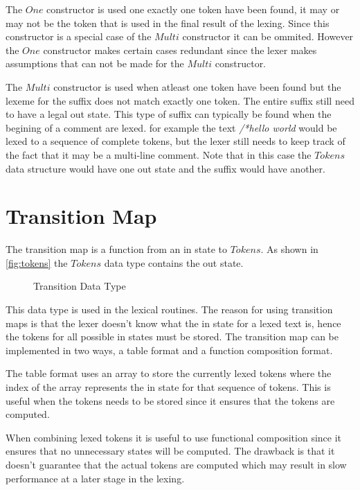 The $One$ constructor is used one exactly one token have been found, it may or
may not be the token that is used in the final result of the lexing. Since this
constructor is a special case of the $Multi$ constructor it can be ommited.
However the $One$ constructor makes certain cases redundant since the lexer
makes assumptions that can not be made for the $Multi$ constructor.

The $Multi$ constructor is used when atleast one token have been found but the
lexeme for the suffix does not match exactly one token. The entire suffix still
need to have a legal out state. This type of suffix can typically be found when
the begining of a comment are lexed. for example the text
\emph{/*hello world} would be lexed to a sequence of complete tokens, but the
lexer still needs to keep track of the fact that it may be a multi-line
comment. Note that in this case the $Tokens$ data structure would have one out
state and the suffix would have another.

\section{Transition Map}
The transition map is a function from an in state to $Tokens$. As shown in
\cref{fig:tokens} the $Tokens$ data type contains the out state.

\begin{figure}[h!]
  
  \caption{Transition Data Type \label{fig:transition}}
\end{figure}

This data type is used in the lexical routines. The reason for using transition
maps is that the lexer doesn't know what the in state for a lexed text is, hence
the tokens for all possible in states must be stored. The transition map can be
implemented in two ways, a table format and a function composition format.

The table format uses an array to store the currently lexed tokens where the
index of the array represents the in state for that sequence of tokens. This is
useful when the tokens needs to be stored since it ensures that the tokens are
computed.

When combining lexed tokens it is useful to use functional composition since it
ensures that no unnecessary states will be computed. The drawback is that it
doesn't guarantee that the actual tokens are computed which may result in slow
performance at a later stage in the lexing.

